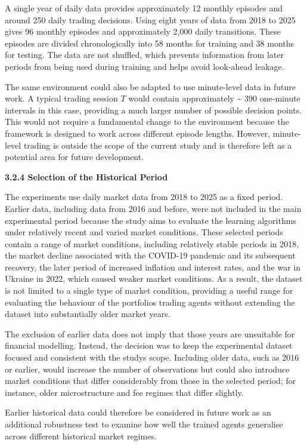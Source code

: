 A single year of daily data provides approximately 12 monthly episodes
and around 250 daily trading decisions. Using eight years of data from
2018 to 2025 gives 96 monthly episodes and approximately 2,000 daily
transitions. These episodes are divided chronologically into 58 months
for training and 38 months for testing. The data are not shuffled, which
prevents information from later periods from being used during training
and helps avoid look-ahead leakage.

The same environment could also be adapted to use minute-level data in
future work. A typical trading session \(T\) would contain approximately
\textasciitilde{} 390 one-minute intervals in this case, providing a
much larger number of possible decision points. This would not require a
fundamental change to the environment because the framework is designed
to work across different episode lengths. However, minute-level trading
is outside the scope of the current study and is therefore left as a
potential area for future development.

\textbf{3.2.4 Selection of the Historical Period}

The experiments use daily market data from 2018 to 2025 as a fixed
period. Earlier data, including data from 2016 and before, were not
included in the main experimental period because the study aims to
evaluate the learning algorithms under relatively recent and varied
market conditions. These selected periods contain a range of market
conditions, including relatively stable periods in 2018, the market
decline associated with the COVID-19 pandemic and its subsequent
recovery, the later period of increased inflation and interest rates,
and the war in Ukraine in 2022, which caused weaker market conditions.
As a result, the dataset is not limited to a single type of market
condition, providing a useful range for evaluating the behaviour of the
portfolios trading agents without extending the dataset into
substantially older market years.

The exclusion of earlier data does not imply that those years are
unsuitable for financial modelling. Instead, the decision was to keep
the experimental dataset focused and consistent with the
study\textquotesingle s scope. Including older data, such as 2016 or
earlier, would increase the number of observations but could also
introduce market conditions that differ considerably from those in the
selected period; for instance, older microstructure and fee regimes that
differ slightly.

Earlier historical data could therefore be considered in future work as
an additional robustness test to examine how well the trained agents
generalise across different historical market regimes.

